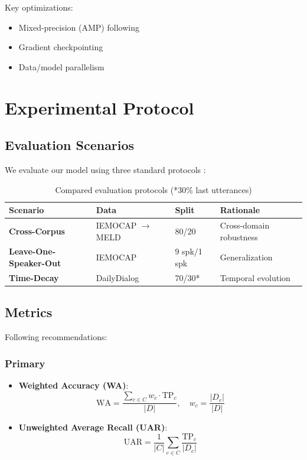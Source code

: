 \documentclass[a4paper,11pt]{article}
\begin{document}
Key optimizations:
\begin{itemize}
    \item Mixed-precision (AMP) following \cite{micikevicius2018mixed}
    \item Gradient checkpointing \cite{chen2016training}
    \item Data/model parallelism \cite{rajbhandari2020zero}
\end{itemize}

\section{Experimental Protocol}
\subsection{Evaluation Scenarios}
We evaluate our model using three standard protocols \cite{poria2019benchmark}:

\begin{table}[h]
\centering
\begin{tabular}{llll}
\toprule
Scenario & Data & Split & Rationale \\
\midrule
\textbf{Cross-Corpus} & IEMOCAP $\rightarrow$ MELD & 80/20 & Cross-domain robustness \cite{zhou2020cross} \\
\textbf{Leave-One-Speaker-Out} & IEMOCAP & 9 spk/1 spk & Generalization \cite{kaya2017exploiting} \\
\textbf{Time-Decay} & DailyDialog & 70/30* & Temporal evolution \cite{chandra2021temporal} \\
\bottomrule
\end{tabular}
\caption{Compared evaluation protocols (*30\% last utterances)}
\label{tab:protocols}
\end{table}

\subsection{Metrics}
Following \cite{schuller2013interspeech} recommendations:

\subsubsection{Primary}
\begin{itemize}
    \item \textbf{Weighted Accuracy (WA)}: 
    \[
    \text{WA} = \frac{\sum_{c \in C} w_c \cdot \text{TP}_c}{|D|}, \quad w_c = \frac{|D_c|}{|D|}
    \]
    
    \item \textbf{Unweighted Average Recall (UAR)}:
    \[
    \text{UAR} = \frac{1}{|C|} \sum_{c \in C} \frac{\text{TP}_c}{|D_c|}
    \]
\end{itemize}
\end{document}

